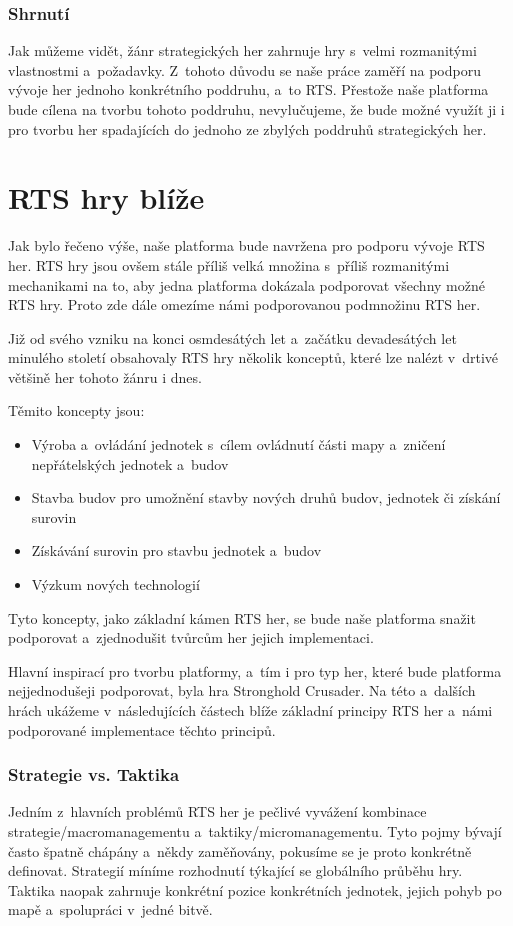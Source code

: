 \subsubsection{Shrnutí}

Jak můžeme vidět, žánr strategických her zahrnuje hry s~velmi rozmanitými vlastnostmi a~požadavky. Z~tohoto důvodu se naše práce zaměří na podporu vývoje her jednoho konkrétního poddruhu, a~to RTS. Přestože naše platforma bude cílena na tvorbu tohoto poddruhu, nevylučujeme, že bude možné využít ji i pro tvorbu her spadajících do jednoho ze zbylých poddruhů strategických her.


\section{RTS hry blíže}
Jak bylo řečeno výše, naše platforma bude navržena pro podporu vývoje RTS her. RTS hry jsou ovšem stále příliš velká množina s~příliš rozmanitými mechanikami na to, aby jedna platforma dokázala podporovat všechny možné RTS hry. Proto zde dále omezíme námi podporovanou podmnožinu RTS her.

Již od svého vzniku na konci osmdesátých let a~začátku devadesátých let minulého století obsahovaly RTS hry několik konceptů, které lze nalézt v~drtivé většině her tohoto žánru i dnes. 

Těmito koncepty jsou:
\begin{itemize}
	\item Výroba a~ovládání jednotek s~cílem ovládnutí části mapy a~zničení nepřátelských jednotek a~budov
	\item Stavba budov pro umožnění stavby nových druhů budov, jednotek či získání surovin
	\item Získávání surovin pro stavbu jednotek a~budov
	\item Výzkum nových technologií
\end{itemize}

Tyto koncepty, jako základní kámen RTS her, se bude naše platforma snažit podporovat a~zjednodušit tvůrcům her jejich implementaci.

Hlavní inspirací pro tvorbu platformy, a~tím i pro typ her, které bude platforma nejjednodušeji podporovat, byla hra Stronghold Crusader. Na této a~dalších hrách ukážeme v~následujících částech blíže základní principy RTS her a~námi podporované implementace těchto principů.

\done
{}
\subsubsection*{Strategie vs. Taktika}
Jedním z~hlavních problémů RTS her je pečlivé vyvážení kombinace strategie/macromanagementu a~taktiky/micromanagementu. Tyto pojmy bývají často špatně chápány a~někdy zaměňovány, pokusíme se je proto konkrétně definovat. Strategií míníme  rozhodnutí týkající se globálního průběhu hry. Taktika  naopak zahrnuje konkrétní pozice konkrétních jednotek, jejich pohyb po mapě a~spolupráci v~jedné bitvě. 

